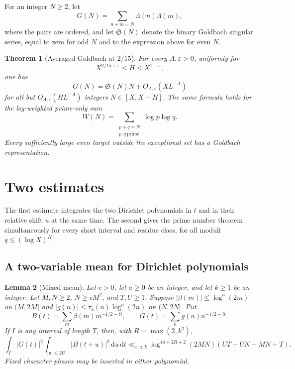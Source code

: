 \documentclass[11pt]{article}
\newtheorem{theorem}{Theorem}[section]
\newtheorem{lemma}[theorem]{Lemma}
\theoremstyle{remark}
\newcommand{\Sg}{\mathfrak S}
\newcommand{\eps}{\varepsilon}
\newcommand{\1}{\mathbf 1}
\newcommand{\dd}{\,\mathrm d}
\begin{document}
For an integer $N\ge2$, let
\[
 G(N)=\sum_{n+m=N}\Lambda(n)\Lambda(m),
\]
where the pairs are ordered, and let $\Sg(N)$ denote the binary Goldbach
singular series, equal to zero for odd $N$ and to the expression above for even
$N$.

\begin{theorem}[Averaged Goldbach at $2/15$]\label{thm:goldbach}
For every $A,\eps>0$, uniformly for
\[
 X^{2/15+\eps}\le H\le X^{1-\eps},
\]
one has
\[
 G(N)=\Sg(N)N+O_{A,\eps}(XL^{-A})                              \tag{1.5}
\]
for all but $O_{A,\eps}(HL^{-A})$ integers $N\in[X,X+H]$.
The same formula holds for the log-weighted prime-only sum
\[
 W(N)=\sum_{\substack{p+q=N\\p,q\ \mathrm{prime}}}\log p\log q.
\]
Every sufficiently large even target outside the exceptional set
has a Goldbach representation.
\end{theorem}

\section{Two estimates}
The first estimate integrates the two Dirichlet polynomials in \(t\) and in
their relative shift \(u\) at the same time.  The second gives the prime number
theorem simultaneously for every short interval and residue class, for all
moduli \(q\le(\log X)^K\).

\subsection{A two-variable mean for Dirichlet polynomials}

\begin{lemma}[Mixed mean]\label{lem:mixed}
Let $c>0$, let $a\ge0$ be an integer, and let $k\ge1$ be an integer.
Let $M,N\ge2$, $N\ge cM^2$, and $T,U\ge1$.  Suppose
$|\beta(m)|\le\log^a(2m)$ on $(M,2M]$ and
$|g(n)|\le\tau_k(n)\log^a(2n)$ on $(N,2N]$.  Put
\[
 B(t)=\sum_m\beta(m)m^{-1/2-it},\qquad
 G(t)=\sum_ng(n)n^{-1/2-it}.
\]
If $I$ is any interval of length $T$, then, with
$R=\max(2,k^2)$,
\[
 \int_I|G(t)|^2\int_{|u|\le2U}|B(t+u)|^2\dd u\dd t
 \ll_{c,a,k}\log^{4a+2R+2}(2MN)(UT+UN+MN+T).          \tag{2.1}
\]
Fixed character phases may be inserted in either polynomial.
\end{lemma}
\end{document}
